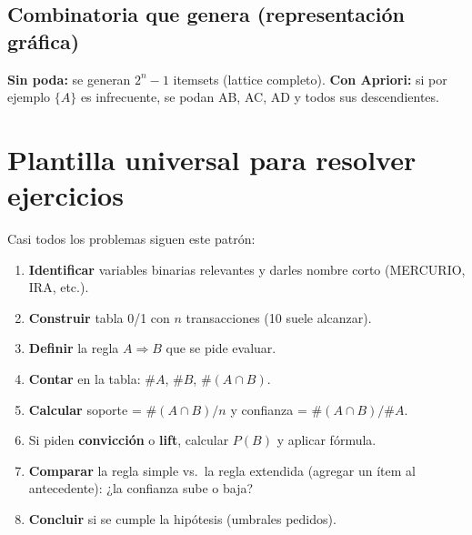 \documentclass[11pt,a4paper]{article}
\begin{document}
\subsection{Combinatoria que genera (representación gráfica)}

\begin{center}
\end{center}

\textbf{Sin poda:} se generan $2^n - 1$ itemsets (lattice completo). \textbf{Con Apriori:}
si por ejemplo $\{A\}$ es infrecuente, se podan AB, AC, AD y todos sus descendientes.

\section{Plantilla universal para resolver ejercicios}

Casi todos los problemas siguen este patrón:

\begin{pasobox}
\begin{enumerate}
    \item \textbf{Identificar} variables binarias relevantes y darles nombre corto (MERCURIO, IRA, etc.).
    \item \textbf{Construir} tabla 0/1 con $n$ transacciones (10 suele alcanzar).
    \item \textbf{Definir} la regla $A \Rightarrow B$ que se pide evaluar.
    \item \textbf{Contar} en la tabla: $\#A$, $\#B$, $\#(A \cap B)$.
    \item \textbf{Calcular} soporte = $\#(A \cap B)/n$ y confianza = $\#(A \cap B)/\#A$.
    \item Si piden \textbf{convicción} o \textbf{lift}, calcular $P(B)$ y aplicar fórmula.
    \item \textbf{Comparar} la regla simple vs.\ la regla extendida (agregar un ítem al antecedente):
          ¿la confianza sube o baja?
    \item \textbf{Concluir} si se cumple la hipótesis (umbrales pedidos).
\end{enumerate}
\end{pasobox}
\end{document}
